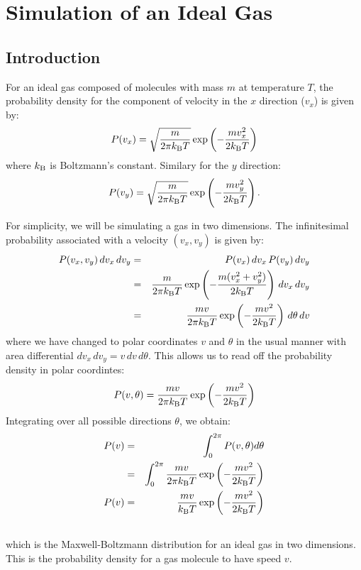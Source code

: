 \chapter{Simulation of an Ideal Gas}

\section{Introduction}

For an ideal gas composed of molecules with mass $m$ at temperature
$T$, the probability density for the component of velocity in the $x$
direction ($v_x$) is given by:
\begin{equation}
  \label{eqn:mbvx}
P(v_x) = \sqrt{\frac{m}{2 \pi k_{\rm B} T}} \exp\left(-\frac{m v_x^2}{2k_{\rm B} T}\right)
\end{equation}
where $k_{\rm B}$ is Boltzmann's constant.  Similary for the $y$ direction:
\begin{equation}
  \label{eqn:mbvx}
P(v_y) = \sqrt{\frac{m}{2 \pi k_{\rm B} T}} \exp\left(-\frac{m v_y^2}{2k_{\rm B} T}\right).
\end{equation}

For simplicity, we will be simulating a gas in two dimensions.  The infinitesimal probability associated with a velocity $(v_x, v_y)$ is given by: 
\begin{eqnarray*}
P(v_x, v_y) \, dv_x \, dv_y &=& P(v_x) \, dv_x \, P(v_y) \, dv_y \\
   &=& \frac{m}{2 \pi k_{\rm B} T} \exp\left(-\frac{m (v_x^2+v_y^2)}{2k_{\rm B} T}\right) \, dv_x \, dv_y \\
   &=& \frac{m v}{2 \pi k_{\rm B} T} \exp\left(-\frac{m v^2}{2k_{\rm B} T}\right) \, d\theta \, dv \\
\end{eqnarray*}
where we have changed to polar coordinates $v$ and $\theta$ in the usual manner with area differential $dv_x \, dv_y = v \, dv \, d\theta$.  This allows us to read off the probability density in polar coordintes:
\begin{equation*}
P(v, \theta) = \frac{m v}{2 \pi k_{\rm B} T} \exp\left(-\frac{m v^2}{2k_{\rm B} T}\right) 
\end{equation*}
Integrating over all possible directions $\theta$, we obtain:
\begin{eqnarray}
P(v) &=& \int_0^{2\pi} P(v,\theta) d\theta \nonumber \\
     &=& \int_0^{2\pi} \frac{m v}{2 \pi k_{\rm B} T} \exp\left(-\frac{m v^2}{2k_{\rm B} T}\right) \nonumber \\
P(v) &=& \frac{m v}{k_{\rm B} T} \exp \left(-\frac{m v^2}{2k_{\rm B} T}\right) \label{eqn:mbv}\\
\nonumber
\end{eqnarray}
which is the Maxwell-Boltzmann distribution for an ideal gas in two
dimensions.  This is the probability density for a gas molecule to have speed
$v$.

